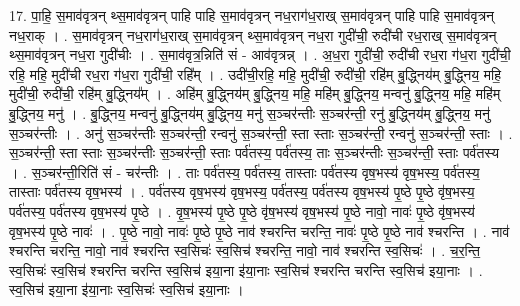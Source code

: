 \documentclass[17pt]{extarticle}
\begin{document}
17. पा॒हि॒ स॒माव॑वृत्रन् थ्स॒माव॑वृत्रन् पाहि पाहि स॒माव॑वृत्रन् नध॒राग॑ध॒राख् स॒माव॑वृत्रन् पाहि पाहि स॒माव॑वृत्रन् नध॒राक् । . स॒माव॑वृत्रन् नध॒राग॑ध॒राख् स॒माव॑वृत्रन् थ्स॒माव॑वृत्रन् नध॒रा गुदी॑ची॒ रुदी॑ची रध॒राख् स॒माव॑वृत्रन् थ्स॒माव॑वृत्रन् नध॒रा गुदी॑चीः । . स॒माव॑वृत्र॒न्निति॑ सं - आव॑वृत्रन्न् । . अ॒ध॒रा गुदी॑ची॒ रुदी॑ची रध॒रा ग॑ध॒रा गुदी॑ची॒ रहि॒ महि॒ मुदी॑ची रध॒रा ग॑ध॒रा गुदी॑ची॒ रहि᳚म् । . उदी॑ची॒रहि॒ महि॒ मुदी॑ची॒ रुदी॑ची॒ रहि॑म् बु॒द्ध्निय॑म् बु॒द्ध्निय॒ महि॒ मुदी॑ची॒ रुदी॑ची॒ रहि॑म् बु॒द्ध्निय᳚म् । . अहि॑म् बु॒द्ध्निय॑म् बु॒द्ध्निय॒ महि॒ महि॑म् बु॒द्ध्निय॒ मन्वनु॑ बु॒द्ध्निय॒ महि॒ महि॑म् बु॒द्ध्निय॒ मनु॑ । . बु॒द्ध्निय॒ मन्वनु॑ बु॒द्ध्निय॑म् बु॒द्ध्निय॒ मनु॑ स॒ञ्चर॑न्तीः स॒ञ्चर॑न्ती॒ रनु॑ बु॒द्ध्निय॑म् बु॒द्ध्निय॒ मनु॑ स॒ञ्चर॑न्तीः । . अनु॑ स॒ञ्चर॑न्तीः स॒ञ्चर॑न्ती॒ रन्वनु॑ स॒ञ्चर॑न्ती॒ स्ता स्ताः स॒ञ्चर॑न्ती॒ रन्वनु॑ स॒ञ्चर॑न्ती॒ स्ताः । . स॒ञ्चर॑न्ती॒ स्ता स्ताः स॒ञ्चर॑न्तीः स॒ञ्चर॑न्ती॒ स्ताः पर्व॑तस्य॒ पर्व॑तस्य॒ ताः स॒ञ्चर॑न्तीः स॒ञ्चर॑न्ती॒ स्ताः पर्व॑तस्य । . स॒ञ्चर॑न्ती॒रिति॑ सं - चर॑न्तीः । . ताः पर्व॑तस्य॒ पर्व॑तस्य॒ तास्ताः पर्व॑तस्य वृष॒भस्य॑ वृष॒भस्य॒ पर्व॑तस्य॒ तास्ताः पर्व॑तस्य वृष॒भस्य॑ । . पर्व॑तस्य वृष॒भस्य॑ वृष॒भस्य॒ पर्व॑तस्य॒ पर्व॑तस्य वृष॒भस्य॑ पृ॒ष्ठे पृ॒ष्ठे वृ॑ष॒भस्य॒ पर्व॑तस्य॒ पर्व॑तस्य वृष॒भस्य॑ पृ॒ष्ठे । . वृ॒ष॒भस्य॑ पृ॒ष्ठे पृ॒ष्ठे वृ॑ष॒भस्य॑ वृष॒भस्य॑ पृ॒ष्ठे नावो॒ नावः॑ पृ॒ष्ठे वृ॑ष॒भस्य॑ वृष॒भस्य॑ पृ॒ष्ठे नावः॑ । . पृ॒ष्ठे नावो॒ नावः॑ पृ॒ष्ठे पृ॒ष्ठे नाव॑ श्चरन्ति चरन्ति॒ नावः॑ पृ॒ष्ठे पृ॒ष्ठे नाव॑ श्चरन्ति । . नाव॑ श्चरन्ति चरन्ति॒ नावो॒ नाव॑ श्चरन्ति स्व॒सिचः॑ स्व॒सिच॑ श्चरन्ति॒ नावो॒ नाव॑ श्चरन्ति स्व॒सिचः॑ । . च॒र॒न्ति॒ स्व॒सिचः॑ स्व॒सिच॑ श्चरन्ति चरन्ति स्व॒सिच॑ इया॒ना इ॑या॒नाः स्व॒सिच॑ श्चरन्ति चरन्ति स्व॒सिच॑ इया॒नाः । . स्व॒सिच॑ इया॒ना इ॑या॒नाः स्व॒सिचः॑ स्व॒सिच॑ इया॒नाः । \newline
\end{document}
